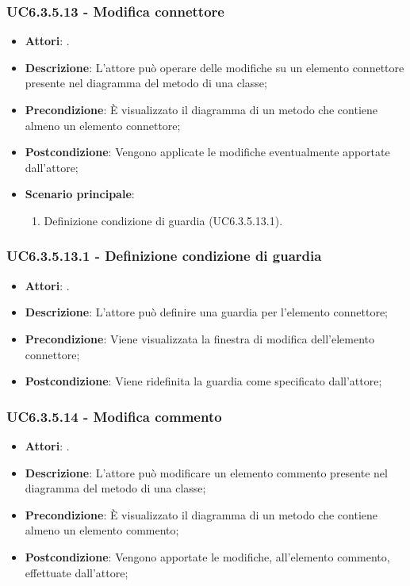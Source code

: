 \subsubsection{UC6.3.5.13 - Modifica connettore} 
\label{sssec:UC6.3.5.13} 
\begin{itemize} 
\item \textbf{Attori}: .
\item \textbf{Descrizione}: L'attore può operare delle modifiche su un elemento connettore presente nel diagramma del metodo di una classe;
\item \textbf{Precondizione}: È visualizzato il diagramma di un metodo che contiene almeno un elemento connettore;
\item \textbf{Postcondizione}: Vengono applicate le modifiche eventualmente apportate dall'attore;
\item \textbf{Scenario principale}: \begin{enumerate}\item Definizione condizione di guardia (UC6.3.5.13.1). 
 \end{enumerate}
\end{itemize} 
\subsubsection{UC6.3.5.13.1 - Definizione condizione di guardia} 
\label{sssec:UC6.3.5.13.1} 
\begin{itemize} 
\item \textbf{Attori}: .
\item \textbf{Descrizione}: L'attore può definire una guardia per l'elemento connettore;
\item \textbf{Precondizione}: Viene visualizzata la finestra di modifica dell'elemento connettore;
\item \textbf{Postcondizione}: Viene ridefinita la guardia come specificato dall'attore;
\end{itemize} 
\subsubsection{UC6.3.5.14 - Modifica commento} 
\label{sssec:UC6.3.5.14} 
\begin{itemize} 
\item \textbf{Attori}: .
\item \textbf{Descrizione}: L'attore può modificare un elemento commento presente nel diagramma del metodo di una classe;
\item \textbf{Precondizione}: È visualizzato il diagramma di un metodo che contiene almeno un elemento commento;
\item \textbf{Postcondizione}: Vengono apportate le modifiche, all'elemento commento, effettuate dall'attore;
\end{itemize} 
